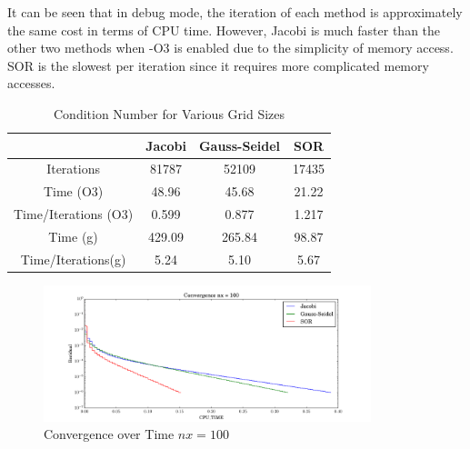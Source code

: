 \documentclass[letterpaper,12pt,]{article}
\begin{document}
It can be seen that in debug mode, the iteration of each method is approximately the same cost in terms of CPU time.
However, Jacobi is much faster than the other two methods when -O3 is enabled due to the simplicity of memory access. SOR is the slowest per iteration since it requires more complicated memory accesses.

\begin{table}[h]
\centering
\begin{tabular}{cccc} \toprule
    {} & {Jacobi} & {Gauss-Seidel} & {SOR}\\ \midrule
    {Iterations} & 81787 & 52109 & 17435\\
    {Time (O3)} & 48.96 & 45.68 & 21.22\\
    {Time/Iterations (O3)} & 0.599 & 0.877 & 1.217\\
    {Time (g)} & 429.09 & 265.84 & 98.87\\
    {Time/Iterations(g)} & 5.24 & 5.10 & 5.67\\
\bottomrule
\end{tabular}
\caption{Condition Number for Various Grid Sizes}
\label{tab2}
\end{table}

\begin{figure}[!h]
    \centering
    \includegraphics[width = 0.85\textwidth]{./Figures/time100.pdf}
    \caption{Convergence over Time $nx = 100$}
    \label{fig:time100}
\end{figure}
\end{document}
